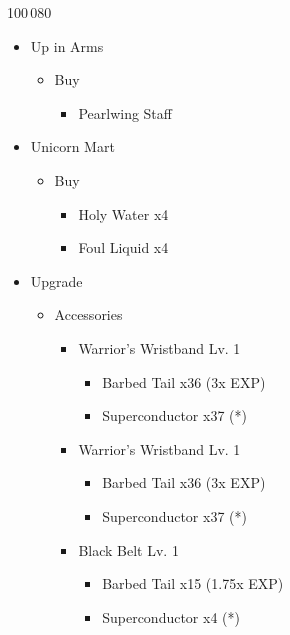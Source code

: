 \documentclass{report}
\begin{document}
\begin{shop}{100\,080}
\begin{itemize}
    \item Up in Arms
    \begin{itemize}
        \item Buy
        \begin{itemize}
            \item Pearlwing Staff
        \end{itemize}
    \end{itemize}
    \item Unicorn Mart
    \begin{itemize}
        \item Buy
        \begin{itemize}
            \item Holy Water x4
            \item Foul Liquid x4
        \end{itemize}
    \end{itemize}
\end{itemize}
\end{shop}
\begin{upgrade}
\begin{itemize}
    \item Upgrade
    \begin{itemize}
        \item Accessories
        \begin{itemize}
            \item Warrior's Wristband Lv. 1
            \begin{itemize}
                \item Barbed Tail x36 (3x EXP)
                \item Superconductor x37 (*)
            \end{itemize}
            \item Warrior's Wristband Lv. 1
            \begin{itemize}
                \item Barbed Tail x36 (3x EXP)
                \item Superconductor x37 (*)
            \end{itemize}
            \item Black Belt Lv. 1
            \begin{itemize}
                \item Barbed Tail x15 (1.75x EXP)
                \item Superconductor x4 (*)
            \end{itemize}
        \end{itemize}
    \end{itemize}
\end{itemize}
\end{upgrade}
\end{document}
